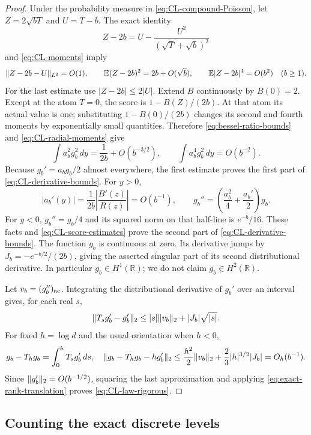 \begin{proof}
Under the probability measure in \eqref{eq:CL-compound-Poisson}, let
$Z=2\sqrt{bT}$ and $U=T-b$.  The exact identity
\[
 Z-2b=U-\frac{U^2}{(\sqrt T+\sqrt b)^2}
\]
and \eqref{eq:CL-moments} imply
\begin{equation}\label{eq:CL-radial-moments}
 \lVert Z-2b-U\rVert_{L^2}=O(1),\qquad
 \mathbb E(Z-2b)^2=2b+O(\sqrt b),\qquad
 \mathbb E|Z-2b|^4=O(b^2)
 \quad(b\geq1).
\end{equation}
For the last estimate use $|Z-2b|\leq2|U|$.
Extend $B$ continuously by $B(0)=2$.  Except at the atom $T=0$,
the score is $1-B(Z)/(2b)$.  At that atom its actual value is one;
substituting $1-B(0)/(2b)$ changes its second and fourth moments by
exponentially small quantities.  Therefore
\eqref{eq:bessel-ratio-bounds} and \eqref{eq:CL-radial-moments} give
\begin{equation}\label{eq:CL-score-estimates}
 \int a_b^2g_b^2\,dy=\frac1{2b}+O(b^{-3/2}),
 \qquad
 \int a_b^4g_b^2\,dy=O(b^{-2}).
\end{equation}
Because $g_b'=a_bg_b/2$ almost everywhere, the first estimate proves
the first part of \eqref{eq:CL-derivative-bounds}.
For $y>0$,
\[
 |a_b'(y)|=\frac1{2b}\left|\frac{B'(z)}{R(z)}\right|=O(b^{-1}),
 \qquad
 g_b''=\left(\frac{a_b^2}{4}+\frac{a_b'}2\right)g_b.
\]
For $y<0$, $g_b''=g_b/4$ and its squared norm on that half-line is
$e^{-b}/16$.  These facts and \eqref{eq:CL-score-estimates} prove the
second part of \eqref{eq:CL-derivative-bounds}.
The function $g_b$ is continuous at zero.  Its derivative jumps by
$J_b=-e^{-b/2}/(2b)$, giving the asserted singular part of its second
distributional derivative.  In particular $g_b\in H^1(\mathbb R)$;
we do not claim $g_b\in H^2(\mathbb R)$.

Let $v_b=(g_b'')_{\rm ac}$.  Integrating the distributional derivative
of $g_b'$ over an interval gives, for each real $s$,
\[
 \lVert T_sg_b'-g_b'\rVert_2
 \leq |s|\lVert v_b\rVert_2+|J_b|\sqrt{|s|}.
\]
For fixed $h=\log d$ and the usual orientation when $h<0$,
\[
 g_b-T_hg_b=\int_0^h T_sg_b'\,ds,
 \quad
 \lVert g_b-T_hg_b-hg_b'\rVert_2
 \leq\frac{h^2}{2}\lVert v_b\rVert_2
      +\frac23|h|^{3/2}|J_b|=O_h(b^{-1}).
\]
Since $\lVert g_b'\rVert_2=O(b^{-1/2})$, squaring the last approximation
and applying \eqref{eq:exact-rank-translation} proves
\eqref{eq:CL-law-rigorous}.
\end{proof}

\subsection{Counting the exact discrete levels}

